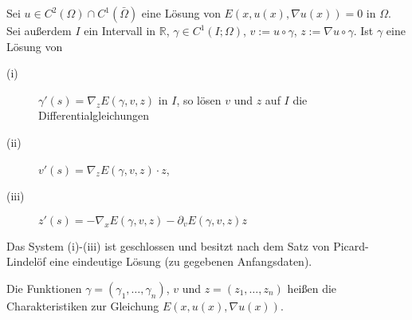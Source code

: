\begin{satz}
	Sei $u \in C^2(\Omega) \cap C^1(\bar{\Omega})$ eine Lösung von $E(x,u(x), \nabla u(x))= 0 $ in $\Omega$. Sei außerdem $I$ ein Intervall in $\mathbb{R}$, 
	$\gamma \in C^1(I;\Omega)$, $v:= u \circ \gamma$, $z:=  \nabla u \circ \gamma$. Ist $\gamma$ eine Lösung von 
	\begin{description}
		\item[(i)] $\gamma'(s) =  \nabla _z E(\gamma,v,z)$ in $I$, so lösen $v$ und $z$ auf $I$ die Differentialgleichungen
		\item[(ii)] $v'(s)=  \nabla_z E(\gamma,v,z) \cdot z$,
		\item[(iii)] $z'(s) = -  \nabla_x E(\gamma,v,z) - \partial_v E(\gamma,v,z)z$
	\end{description}
\end{satz}
\begin{bemerkung}
	Das System (i)-(iii) ist geschlossen und besitzt nach dem Satz von Picard-Lindelöf eine eindeutige Lösung (zu gegebenen Anfangsdaten).
\end{bemerkung}
\begin{definition*}
	Die Funktionen $\gamma = (\gamma_1, \dots, \gamma_n)$, $v$ und $z = (z_1, \dots, z_n)$ heißen die Charakteristiken zur Gleichung $E(x,u(x), \nabla u(x))$.
\end{definition*}




